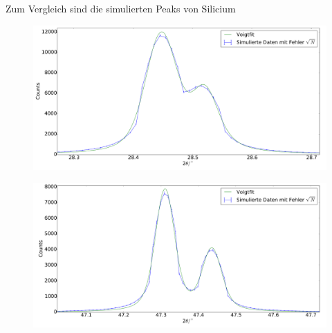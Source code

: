 Zum Vergleich sind die simulierten Peaks von Silicium
\begin{figure}[H]
\begin{minipage}{.5\textwidth}
  \centering
  \includegraphics[scale=0.15]{Simulation_Siliciumpulver_1}
  \label{fig:pul_sim_sil_1}
\end{minipage}
\hspace{0.5cm}
\begin{minipage}{.5\textwidth}
  \centering
  \includegraphics[scale=0.15]{Simulation_Siliciumpulver_2}
  \label{fig:pul_sim_sil_2}
\end{minipage}
\end{figure}
